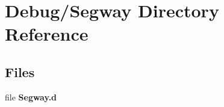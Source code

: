 \section{Debug/\+Segway Directory Reference}
\label{dir_c7d992da8e6ad94eb9664d699ec90c8f}
\subsection*{Files}
\begin{DoxyCompactItemize}
\item 
file {\bfseries Segway.\+d}
\end{DoxyCompactItemize}

